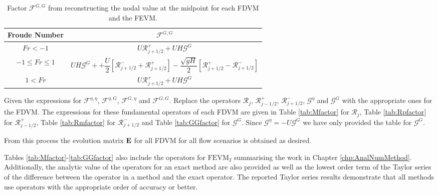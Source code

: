 \begin{table}
	\centering
	\begin{tabular}{c  c }
		Froude Number& $\mathcal{F}^{G,G} $ \T \B\\
		\hline
		$Fr < -1$ & $U\mathcal{R}^+_{j+1/2}  +  UH \mathcal{G}^G$ \T\B \\
		$-1 \le Fr \le 1$ & $ UH\mathcal{G}^{G} + + \dfrac{U}{2} \left[ \mathcal{R}^-_{j+1/2} +\mathcal{R}^+_{j+1/2} \right] - \dfrac{\sqrt{g H}}{2} \left [\mathcal{R}^+_{j+1/2} - \mathcal{R}^-_{j+1/2} \right ]$ \T\B\\
		$1 < Fr$ & $U\mathcal{R}^+_{j+1/2}  +  UH \mathcal{G}^G$ \T\B\\
		\hline
	\end{tabular}
	\caption{Factor $\mathcal{F}^{G,G} $ from reconstructing the nodal value at the midpoint for each FDVM and the FEVM.}
	\label{tab:FGGfactor}
\end{table}

Given the expressions for $\mathcal{F}^{\eta,\eta} $, $\mathcal{F}^{\eta,G}$, $\mathcal{F}^{G,\eta} $ and $\mathcal{F}^{G,G} $. Replace the operators $\mathcal{R}_j$, $\mathcal{R}^+_{j-1/2}$, $\mathcal{R}^-_{j+1/2}$, $\mathcal{G}^\eta$ and $\mathcal{G}^G$ with the appropriate ones for the FDVM. The expressions for these fundamental operators of each FDVM are given in Table \ref{tab:Mfactor} for $\mathcal{R}_j$, Table \ref{tab:Rpfactor} for $\mathcal{R}^+_{j-1/2}$, Table \ref{tab:Rmfactor} for $\mathcal{R}^-_{j+1/2}$ and Table \ref{tab:GGfactor} for $\mathcal{G}^G$. Since $\mathcal{G}^\eta = -U\mathcal{G}^G $ we have only provided the table for $\mathcal{G}^G$. 

From this process the evolution matrix $\mathbf{E}$ for all FDVM for all flow scenarios is obtained as desired. 

Tables \ref{tab:Mfactor}-\ref{tab:GGfactor} also include the operators for $\text{FEVM}_2$ summarising the work in Chapter \ref{chp:AnalNumMethod}. Additionally, the analytic value of the operators for an exact method are also provided as well as the lowest order term of the Taylor series of the difference between the operator in a method and the exact operator. The reported Taylor series results demonstrate that all methods use operators with the appropriate order of accuracy or better. 


